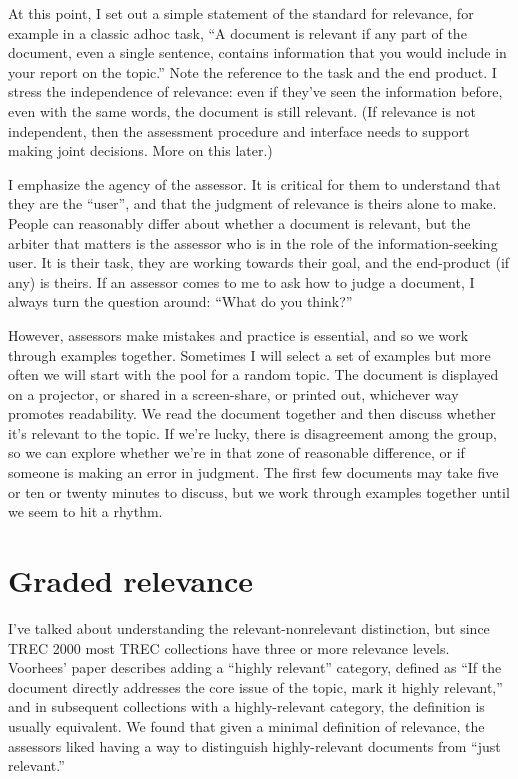 \documentclass[nobib]{tufte-book}
\begin{document}
At this point, I set out a simple statement of the standard for relevance, for example in a classic adhoc task, ``A document is relevant if any part of the document, even a single sentence, contains information that you would include in your report on the topic.''  Note the reference to the task and the end product.  I stress the independence of relevance: even if they've seen the information before, even with the same words, the document is still relevant.  (If relevance is not independent, then the assessment procedure and interface needs to support making joint decisions.  More on this later.)

I emphasize the agency of the assessor.  It is critical for them to understand that they are the ``user'', and that the judgment of relevance is theirs alone to make.  People can reasonably differ about whether a document is relevant, but the arbiter that matters is the assessor who is in the role of the information-seeking user.  It is their task, they are working towards their goal, and the end-product (if any) is theirs.  If an assessor comes to me to ask how to judge a document, I always turn the question around: ``What do you think?''

However, assessors make mistakes and practice is essential, and so we work through examples together.  Sometimes I will select a set of examples but more often we will start with the pool for a random topic.  The document is displayed on a projector, or shared in a screen-share, or printed out, whichever way promotes readability.  We read the document together and then discuss whether it's relevant to the topic.  If we're lucky, there is disagreement among the group, so we can explore whether we're in that zone of reasonable difference, or if someone is making an error in judgment.  The first few documents may take five or ten or twenty minutes to discuss, but we work through examples together until we seem to hit a rhythm.

\section{Graded relevance}

I've talked about understanding the relevant-nonrelevant distinction, but since TREC 2000 most TREC collections have three or more relevance levels.  Voorhees' paper\autocite{voorhees_evaluation_2001} describes adding a ``highly relevant'' category, defined as ``If the document directly addresses the core issue of the topic, mark it highly relevant,'' and in subsequent collections with a highly-relevant category, the definition is usually equivalent.  We found that given a minimal definition of relevance, the assessors liked having a way to distinguish highly-relevant documents from ``just relevant.''
\end{document}
